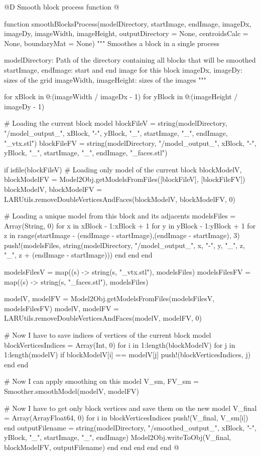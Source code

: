 \documentclass[11pt,oneside]{article}	%
\begin{document}
@D Smooth block process function
@{function smoothBlocksProcess(modelDirectory,
			      startImage, endImage,
			      imageDx, imageDy,
			      imageWidth, imageHeight,
			      outputDirectory = None,
			      centroidsCalc = None, boundaryMat = None)
  """
  Smoothes a block in a single process

  modelDirectory: Path of the directory containing all blocks
                  that will be smoothed
  startImage, endImage: start and end image for this block
  imageDx, imageDy: sizes of the grid
  imageWidth, imageHeight: sizes of the images
  """

  for xBlock in 0:(imageWidth / imageDx - 1)
    for yBlock in 0:(imageHeight / imageDy - 1)

      # Loading the current block model
      blockFileV = string(modelDirectory, "/model_output_", xBlock, "-", yBlock,
			  "_", startImage, "_", endImage, "_vtx.stl")
      blockFileFV = string(modelDirectory, "/model_output_", xBlock, "-", yBlock,
			  "_", startImage, "_", endImage, "_faces.stl")

      if isfile(blockFileV)
        # Loading only model of the current block
        blockModelV, blockModelFV = Model2Obj.getModelsFromFiles([blockFileV], [blockFileFV])
        blockModelV, blockModelFV = LARUtils.removeDoubleVerticesAndFaces(blockModelV, blockModelFV, 0)

        # Loading a unique model from this block and its adjacents
        modelsFiles = Array(String, 0)
        for x in xBlock - 1:xBlock + 1
          for y in yBlock - 1:yBlock + 1
            for z in range(startImage - (endImage - startImage),(endImage - startImage), 3)
              push!(modelsFiles, string(modelDirectory, "/model_output_",
					x, "-", y, "_", z, "_", z + (endImage - startImage)))
            end
          end
        end

        modelsFilesV = map((s) -> string(s, "_vtx.stl"), modelsFiles)
        modelsFilesFV = map((s) -> string(s, "_faces.stl"), modelsFiles)

        modelV, modelFV = Model2Obj.getModelsFromFiles(modelsFilesV, modelsFilesFV)
        modelV, modelFV = LARUtils.removeDoubleVerticesAndFaces(modelV, modelFV, 0)

        # Now I have to save indices of vertices of the current block model
        blockVerticesIndices = Array(Int, 0)
        for i in 1:length(blockModelV)
          for j in 1:length(modelV)
            if blockModelV[i] == modelV[j]
              push!(blockVerticesIndices, j)
            end
          end

          # Now I can apply smoothing on this model
          V_sm, FV_sm = Smoother.smoothModel(modelV, modelFV)

          # Now I have to get only block vertices and save them on the new model
          V_final = Array(Array{Float64}, 0)
          for i in blockVerticesIndices
            push!(V_final, V_sm[i])
          end
          outputFilename = string(modelDirectory, "/smoothed_output_", xBlock, "-",
				  yBlock, "_", startImage, "_", endImage)
          Model2Obj.writeToObj(V_final, blockModelFV, outputFilename)
        end
      end
    end
  end
end @}
\end{document}
